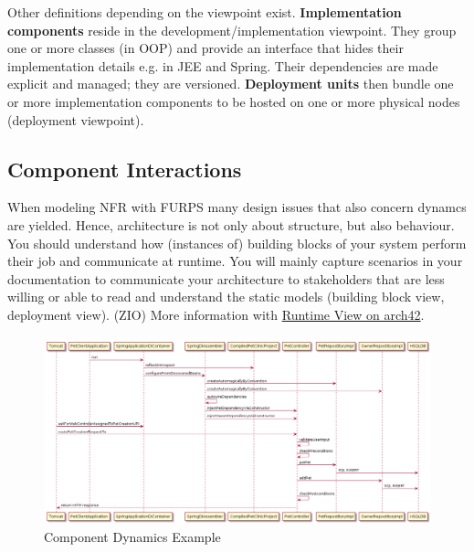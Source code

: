 \documentclass[../Main.tex]{subfiles}
\begin{document}
Other definitions depending on the viewpoint exist.
\textbf{Implementation components} reside in the development/implementation viewpoint. They group one 
or more classes (in OOP) and provide an interface that hides their implementation details e.g. in 
JEE and Spring. Their dependencies are made explicit and managed; they are versioned.
\textbf{Deployment units} then bundle one or more implementation components to be hosted on one or 
more physical nodes (deployment viewpoint).

\newpage
\subsection{Component Interactions}
When modeling NFR with FURPS many design issues that also
concern dynamcs are yielded. Hence, architecture is not only
about structure, but also behaviour.
You should understand how (instances of) building blocks of
your system perform their job and communicate at runtime.
You will mainly capture scenarios in your documentation
to communicate your architecture to stakeholders that are
less willing or able to read and understand the static models
(building block view, deployment view). (ZIO)
More information with \href{http://docs.arc42.org/section-6/}{Runtime View on arch42}.

\begin{figure}[H]
    \centering
    \includegraphics[width=1\linewidth]{Images/component-dynamics.png}
    \caption{Component Dynamics Example}
\end{figure}
\newpage
\end{document}
